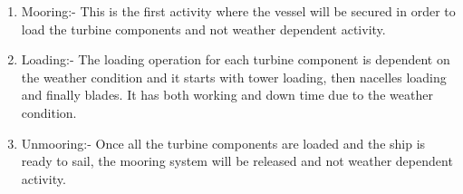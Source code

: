 \begin{enumerate}
\item Mooring:- This is the first activity where the vessel will be secured in order to load the turbine components and not weather dependent activity.
\item Loading:- The loading operation for each turbine component is dependent on the weather condition and it starts with tower loading, then nacelles loading and finally blades. It has both working and down time due to the weather condition.
\item Unmooring:- Once all the turbine components are loaded and the ship is ready to sail, the mooring system will be released and not weather dependent activity.
\end{enumerate}